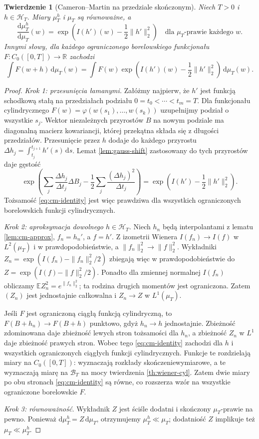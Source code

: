 \documentclass[11pt,a4paper,oneside]{report}
\numberwithin{equation}{chapter}
\theoremstyle{plain}
\newtheorem{twierdzenie}{Twierdzenie}[chapter]
\theoremstyle{definition}
\theoremstyle{remark}
\newcommand{\R}{\mathbb{R}}
\newcommand{\E}{\mathbb{E}}
\newcommand{\calH}{\mathcal{H}}
\newcommand{\dd}{\mathrm{d}}
\begin{document}
\begin{twierdzenie}[Cameron--Martin na przedziale skończonym]
\label{th:cameron-martin}
Niech $T>0$ i $h\in\calH_T$.
Miary $\mu_T^h$ i $\mu_T$ są równoważne, a
\[
\frac{\dd\mu_T^h}{\dd\mu_T}(w)
=\exp\left(I(h')(w)-\frac12\|h'\|_2^2\right)
\quad\text{dla }\mu_T\text{-prawie każdego }w.
\tag{9.1}\label{eq:cm-density}
\]
Innymi słowy, dla każdego ograniczonego borelowskiego
funkcjonału $F:C_0([0,T])\to\R$ zachodzi
\[
\int F(w+h)\,\dd\mu_T(w)
=\int F(w)\exp\left(I(h')(w)-\frac12\|h'\|_2^2\right)
\,\dd\mu_T(w).
\tag{9.2}\label{eq:cm-identity}
\]
\end{twierdzenie}
\begin{proof}
\emph{Krok 1: przesunięcia łamanymi.} Załóżmy najpierw, że
$h'$ jest funkcją schodkową stałą na przedziałach podziału
$0=t_0<\cdots<t_m=T$. Dla funkcjonału cylindrycznego
$F(w)=\varphi(w(s_1),\ldots,w(s_k))$ uzupełnijmy podział
o wszystkie $s_j$. Wektor niezależnych przyrostów $B$ na
nowym podziale ma diagonalną macierz kowariancji, której
przekątna składa się z długości przedziałów.
Przesunięcie przez $h$ dodaje do każdego przyrostu
$\Delta h_j=\int_{t_j}^{t_{j+1}}h'(s)\,\dd s$.
Lemat \ref{lem:gauss-shift} zastosowany do tych przyrostów
daje gęstość
\[
\exp\left(\sum_j\frac{\Delta h_j}{\Delta t_j}\Delta B_j
 -\frac12\sum_j\frac{(\Delta h_j)^2}{\Delta t_j}\right)
=\exp\left(I(h')-\frac12\|h'\|_2^2\right).
\]
Tożsamość \eqref{eq:cm-identity} jest więc prawdziwa dla
wszystkich ograniczonych borelowskich funkcji cylindrycznych.

\emph{Krok 2: aproksymacja dowolnego $h\in\calH_T$.}
Niech $h_n$ będą interpolantami z lematu \ref{lem:cm-approx},
$f_n=h_n'$, a $f=h'$. Z izometrii Wienera
$I(f_n)\to I(f)$ w $L^2(\mu_T)$ i w prawdopodobieństwie,
a $\|f_n\|_2^2\to\|f\|_2^2$. Wykładniki
$Z_n=\exp(I(f_n)-\|f_n\|_2^2/2)$ zbiegają więc
w prawdopodobieństwie do
$Z=\exp(I(f)-\|f\|_2^2/2)$.
Ponadto dla zmiennej normalnej $I(f_n)$ obliczamy
$\E Z_n^2=e^{\|f_n\|_2^2}$; ta rodzina drugich
momentów jest ograniczona. Zatem $(Z_n)$ jest jednostajnie
całkowalna i $Z_n\to Z$ w $L^1(\mu_T)$.

Jeśli $F$ jest ograniczoną ciągłą funkcją cylindryczną,
to $F(B+h_n)\to F(B+h)$ punktowo, gdyż $h_n\to h$
jednostajnie. Zbieżność zdominowana daje zbieżność
lewych stron tożsamości dla $h_n$, a zbieżność $Z_n$
w $L^1$ daje zbieżność prawych stron.
Wobec tego \eqref{eq:cm-identity} zachodzi dla $h$ i
wszystkich ograniczonych ciągłych funkcji cylindrycznych.
Funkcje te rozdzielają miary na $C_0([0,T])$:
wyznaczają rozkłady skończeniewymiarowe, a te wyznaczają
miarę na $\mathcal B_T$ na mocy twierdzenia \ref{th:wiener-cyl}.
Zatem dwie miary po obu stronach \eqref{eq:cm-identity}
są równe, co rozszerza wzór na wszystkie ograniczone
borelowskie $F$.

\emph{Krok 3: równoważność.} Wykładnik $Z$ jest ściśle
dodatni i skończony $\mu_T$-prawie na pewno.
Ponieważ $\dd\mu_T^h=Z\,\dd\mu_T$, otrzymujemy
$\mu_T^h\ll\mu_T$; dodatniość $Z$ implikuje też
$\mu_T\ll\mu_T^h$.
\end{proof}
\end{document}
